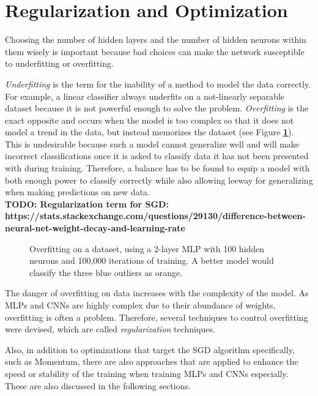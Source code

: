 	\section {Regularization and Optimization}
\label{sec:reg_opt}

Choosing the number of hidden layers and the number of hidden neurons within them wisely is important because bad choices can make the network susceptible to underfitting or overfitting.

\textit{Underfitting} is the term for the inability of a method to model the data correctly. For example, a linear classifier always underfits on a not-linearly separable dataset because it is not powerful enough to solve the problem. \textit{Overfitting} is the exact opposite and occurs when the model is too complex so that it does not model a trend in the data, but instead memorizes the dataset (see Figure \textbf{\ref{fig:overfit}}). This is undesirable because such a model cannot generalize well and will make incorrect classifications once it is asked to classify data it has not been presented with during training. Therefore, a balance has to be found to equip a model with both enough power to classify correctly while also allowing leeway for generalizing when making predictions on new data.\\

\textbf{TODO: Regularization term for SGD: https://stats.stackexchange.com/questions/29130/difference-between-neural-net-weight-decay-and-learning-rate}\\

	\begin {figure}[!htb]
		\begin{center}
			\scalebox{0.75}{}
		\end{center}
		\caption[Overfitting on a dataset.]{Overfitting on a dataset, using a 2-layer MLP with 100 hidden neurons and 100,000 iterations of training. A better model would classify the three blue outliers as orange.}
		\label{fig:overfit}
	\end {figure}

\noindent The danger of overfitting on data increases with the complexity of the model. As MLPs and CNNs are highly complex due to their abundance of weights, overfitting is often a problem. Therefore, several techniques to control overfitting were devised, which are called \textit{regularization} techniques.

Also, in addition to optimizations that target the SGD algorithm specifically, such as Momentum, there are also approaches that are applied to enhance the speed or stability of the training when training MLPs and CNNs especially. These are also discussed in the following sections.


